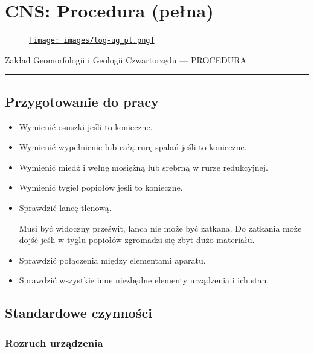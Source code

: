 \documentclass[
  letterpaper,
  DIV=11,
  numbers=noendperiod]{scrreprt}
\begin{document}
\hypertarget{cns-procedura-peux142na}{%
\chapter{CNS: Procedura (pełna)}\label{cns-procedura-peux142na}}

\begin{figure}

\href{https://geomorfologia.ug.edu.pl}{\texttt{[image: images/log-ug\_pl.png]}}

\end{figure}

Zakład Geomorfologii i Geologii Czwartorzędu --- PROCEDURA

\begin{center}\rule{0.5\linewidth}{0.5pt}\end{center}

\hypertarget{przygotowanie-do-pracy}{%
\section{Przygotowanie do pracy}\label{przygotowanie-do-pracy}}

\begin{itemize}
\item
  Wymienić osuszki jeśli to konieczne.
\item
  Wymienić wypełnienie lub całą rurę spalań jeśli to konieczne.
\item
  Wymienić miedź i wełnę mosiężną lub srebrną w rurze redukcyjnej.
\item
  Wymienić tygiel popiołów jeśli to konieczne.
\item
  Sprawdzić lancę tlenową.

  Musi być widoczny prześwit, lanca nie może być zatkana. Do zatkania
  może dojść jeśli w tyglu popiołów zgromadzi się zbyt dużo materiału.
\item
  Sprawdzić połączenia między elementami aparatu.
\item
  Sprawdzić wszystkie inne niezbędne elementy urządzenia i ich stan.
\end{itemize}

\hypertarget{standardowe-czynnoux15bci}{%
\section{Standardowe czynności}\label{standardowe-czynnoux15bci}}

\hypertarget{rozruch-urzux105dzenia}{%
\subsection{Rozruch urządzenia}\label{rozruch-urzux105dzenia}}
\end{document}
